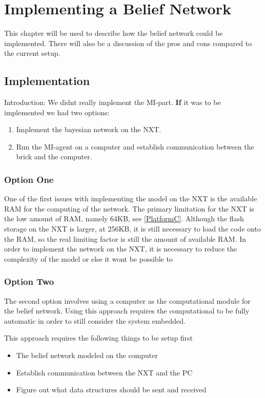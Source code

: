 \chapter{Implementing a Belief Network}
This chapter will be used to describe how the belief network could be
implemented. There will also be a discussion of the pros and cons compared to
the current setup.

\section{Implementation}

Introduction: We didnt really implement the MI-part.
\textbf{If} it was to be implemented we had two options:

\begin{enumerate}
\item Implement the bayesian network on the NXT.
\item Run the MI-agent on a computer and establish communication between the brick and the computer.
\end{enumerate}

\subsection{Option One}
One of the first issues with implementing the model on the NXT is the available RAM for the computing of the network. The primary limitation for the NXT is the low amount of RAM, namely 64KB, see \autoref{PlatformC}. Although the flash storage on the NXT is larger, at 256KB, it is still necessary to load the code onto the RAM, so the real limiting factor is still the amount of available RAM. 
In order to implement the network on the NXT, it is necessary to reduce the complexity of the model or else it wont be possible to
\subsection{Option Two}
The second option involves using a computer as the computational module for the belief network. Using this approach requires the computational to be fully automatic in order to still consider the system embedded.

This approach requires the following things to be setup first
\begin{itemize}
\item The belief network modeled on the computer
\item Establish communication between the NXT and the PC
\item Figure out what data structures should be sent and received
\end{itemize}

